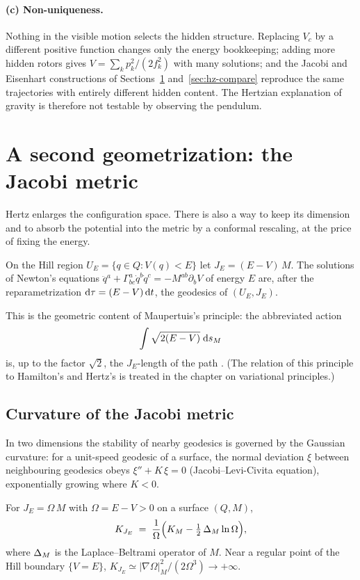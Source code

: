 \paragraph{(c) Non-uniqueness.}
Nothing in the visible motion selects the hidden structure. Replacing $V_c$ by
a different positive function changes only the energy bookkeeping; adding more
hidden rotors gives $V=\sum_kp_k^2/(2f_k^2)$ with many solutions; and the Jacobi
and Eisenhart constructions of Sections~\ref{sec:hz-jacobi}
and~\ref{sec:hz-compare} reproduce the same trajectories with entirely
different hidden content. The Hertzian explanation of gravity is therefore not
testable by observing the pendulum.

\section{A second geometrization: the Jacobi metric}
\label{sec:hz-jacobi}

Hertz enlarges the configuration space. There is also a way to keep its
dimension and to absorb the potential into the metric by a conformal
rescaling, at the price of fixing the energy.

\begin{theorem}[Jacobi]\label{thm:hz-jacobi}
On the Hill region $U_E=\{q\in Q: V(q)<E\}$ let
$J_E=(E-V)\,M$. The solutions of Newton's equations $\ddot q^a+\Gamma^a_{bc}\dot q^b\dot q^c=-M^{ab}\partial_bV$
of energy $E$ are, after the reparametrization $\mathrm{d}\tau=(E-V)\,\mathrm{d} t$, the
geodesics of $(U_E,J_E)$.
\end{theorem}

This is the geometric content of Maupertuis's principle: the abbreviated action
\[
  \int\sqrt{2(E-V)}\;\mathrm{d} s_M
\]
is, up to the factor $\sqrt2$, the $J_E$-length of the path
\cite{hdp:jacobi1866,hdp:arnold1989}. (The relation of this principle to Hamilton's and
Hertz's is treated in the chapter on variational principles.)

\subsection{Curvature of the Jacobi metric}

In two dimensions the stability of nearby geodesics is governed by the Gaussian
curvature: for a unit-speed geodesic of a surface, the normal deviation $\xi$
between neighbouring geodesics obeys $\xi''+K\,\xi=0$ (Jacobi--Levi-Civita
equation), exponentially growing where $K<0$.

\begin{proposition}\label{prop:hz-conformal}
For $J_E=\Omega\,M$ with $\Omega=E-V>0$ on a surface $(Q,M)$,
\begin{equation}\label{eq:hz-KJ}
  K_{J_E}\;=\;\frac{1}{\Omega}\Bigl(K_M-\tfrac12\,\Delta_M\ln\Omega\Bigr),
\end{equation}
where $\Delta_M$ is the Laplace--Beltrami operator of $M$. Near a regular point of the
Hill boundary $\{V=E\}$, $K_{J_E}\simeq|\nabla\Omega|_M^2/(2\Omega^3)\to+\infty$.
\end{proposition}

